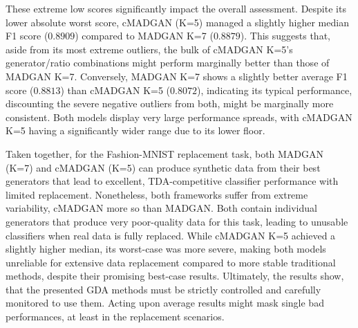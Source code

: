 These extreme low scores significantly impact the overall assessment. Despite its lower absolute worst score, cMADGAN (K=5) managed a slightly higher median F1 score ($0.8909$) compared to MADGAN K=7 ($0.8879$). This suggests that, aside from its most extreme outliers, the bulk of cMADGAN K=5's generator/ratio combinations might perform marginally better than those of MADGAN K=7. Conversely, MADGAN K=7 shows a slightly better average F1 score ($0.8813$) than cMADGAN K=5 ($0.8072$), indicating its typical performance, discounting the severe negative outliers from both, might be marginally more consistent. Both models display very large performance spreads, with cMADGAN K=5 having a significantly wider range due to its lower floor.

Taken together, for the Fashion-MNIST replacement task, both MADGAN (K=7) and cMADGAN (K=5) can produce synthetic data from their best generators that lead to excellent, TDA-competitive classifier performance with limited replacement. Nonetheless, both frameworks suffer from extreme variability, cMADGAN more so than MADGAN. Both contain individual generators that produce very poor-quality data for this task, leading to unusable classifiers when real data is fully replaced. While cMADGAN K=5 achieved a slightly higher median, its worst-case was more severe, making both models unreliable for extensive data replacement compared to more stable traditional methods, despite their promising best-case results. Ultimately, the results show, that the presented GDA methods must be strictly controlled and carefully monitored to use them. Acting upon average results might mask single bad performances, at least in the replacement scenarios. 



